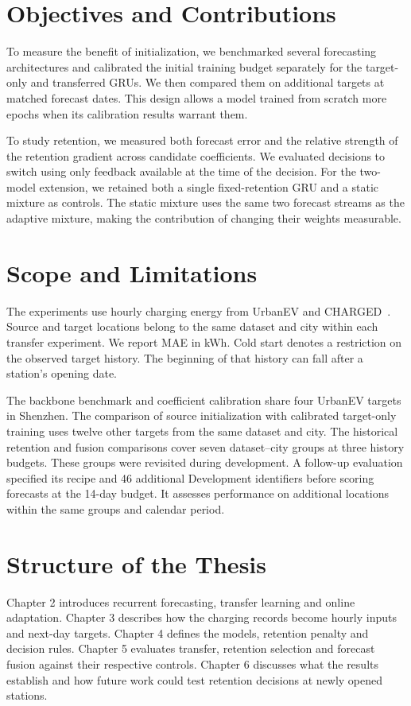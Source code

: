 \section{Objectives and Contributions}

To measure the benefit of initialization, we benchmarked several forecasting architectures and calibrated the initial training budget separately for the target-only and transferred GRUs. We then compared them on additional targets at matched forecast dates. This design allows a model trained from scratch more epochs when its calibration results warrant them.

To study retention, we measured both forecast error and the relative strength of the retention gradient across candidate coefficients. We evaluated decisions to switch using only feedback available at the time of the decision. For the two-model extension, we retained both a single fixed-retention GRU and a static mixture as controls. The static mixture uses the same two forecast streams as the adaptive mixture, making the contribution of changing their weights measurable.

\section{Scope and Limitations}

The experiments use hourly charging energy from UrbanEV and CHARGED~\cite{urbanev2025,charged2025}. Source and target locations belong to the same dataset and city within each transfer experiment. We report MAE in kWh. Cold start denotes a restriction on the observed target history. The beginning of that history can fall after a station's opening date.

The backbone benchmark and coefficient calibration share four UrbanEV targets in Shenzhen. The comparison of source initialization with calibrated target-only training uses twelve other targets from the same dataset and city. The historical retention and fusion comparisons cover seven dataset--city groups at three history budgets. These groups were revisited during development. A follow-up evaluation specified its recipe and 46 additional Development identifiers before scoring forecasts at the 14-day budget. It assesses performance on additional locations within the same groups and calendar period.

\section{Structure of the Thesis}

Chapter 2 introduces recurrent forecasting, transfer learning and online adaptation. Chapter 3 describes how the charging records become hourly inputs and next-day targets. Chapter 4 defines the models, retention penalty and decision rules. Chapter 5 evaluates transfer, retention selection and forecast fusion against their respective controls. Chapter 6 discusses what the results establish and how future work could test retention decisions at newly opened stations.
